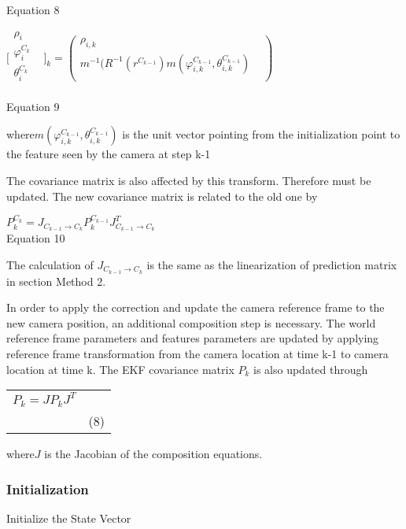Equation 8

\begin{center}$\lbrack \begin{matrix}
\rho _{i} & \\
\varphi _{i}^{C_{k}} & \\
\theta _{i}^{C_{k}} & \\
\end{matrix}
\rbrack _{k}=(\begin{matrix}
\rho _{i, k} & \\
m^{-1}(R^{-1}(r^{C_{k-1}})m(\varphi _{i, k}^{C_{k-1}}, \theta _{i, 
k}^{C_{k-1}}) & \\
\end{matrix}
)$\\
\end{center}

Equation 9

where$m(\varphi _{i, k}^{C_{k-1}}, \theta _{i, k}^{C_{k-1}})$ is the 
unit vector pointing from the initialization point to the feature seen 
by the camera at step k-1

The covariance matrix is also affected by this transform. Therefore must 
be updated. The new covariance matrix is related to the old one by 

$P_{k}^{C_{k}}=J_{C_{k-1}\to C_{k}}P_{k}^{C_{k-1}}J_{C_{k-1}\to 
C_{k}}^{T}$\\


Equation 10

The calculation of $J_{C_{k-1}\to C_{k}}$ is the same as the 
linearization of prediction matrix in section Method 2.

In order to apply the correction and update the camera reference frame 
to the new camera position, an additional composition step is necessary. 
The world reference frame parameters and features parameters are updated 
by applying reference frame transformation from the camera location at 
time k-1 to camera location at time k. The EKF covariance matrix $P_{k}
$ is also updated through

\begin{table}[h]
\centering
\begin{tabular}{|l|l|}
\hline
$P_{k}=JP_{k}J^{T}$\\
 & (8) \\
\hline
\end{tabular}
\end{table}
where$J$ is the Jacobian of the composition equations. 

\subsubsection{Initialization}\label{section:_Toc332876137}
Initialize the State Vector


